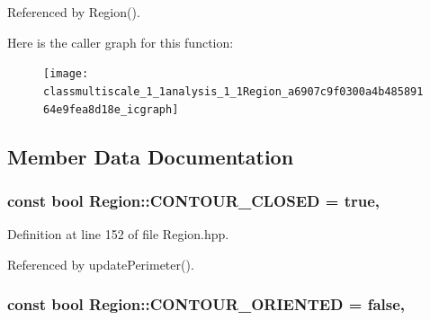 Referenced by Region().



Here is the caller graph for this function\-:\nopagebreak
\begin{figure}[H]
\begin{center}
\leavevmode
\texttt{[image: classmultiscale\_1\_1analysis\_1\_1Region\_a6907c9f0300a4b48589164e9fea8d18e\_icgraph]}
\end{center}
\end{figure}




\subsection{Member Data Documentation}
\hypertarget{classmultiscale_1_1analysis_1_1Region_a52c0c66ccfe38dc19379abaeba529f19}{
\subsubsection[{C\-O\-N\-T\-O\-U\-R\-\_\-\-C\-L\-O\-S\-E\-D}]{\setlength{\rightskip}{0pt plus 5cm}const bool Region\-::\-C\-O\-N\-T\-O\-U\-R\-\_\-\-C\-L\-O\-S\-E\-D = true\hspace{0.3cm}{\ttfamily [static]}, {\ttfamily [private]}}}\label{classmultiscale_1_1analysis_1_1Region_a52c0c66ccfe38dc19379abaeba529f19}


Definition at line 152 of file Region.\-hpp.



Referenced by update\-Perimeter().

\hypertarget{classmultiscale_1_1analysis_1_1Region_a875a0f14dacf6904cabfa1f31020e6e2}{
\subsubsection[{C\-O\-N\-T\-O\-U\-R\-\_\-\-O\-R\-I\-E\-N\-T\-E\-D}]{\setlength{\rightskip}{0pt plus 5cm}const bool Region\-::\-C\-O\-N\-T\-O\-U\-R\-\_\-\-O\-R\-I\-E\-N\-T\-E\-D = false\hspace{0.3cm}{\ttfamily [static]}, {\ttfamily [private]}}}\label{classmultiscale_1_1analysis_1_1Region_a875a0f14dacf6904cabfa1f31020e6e2}


